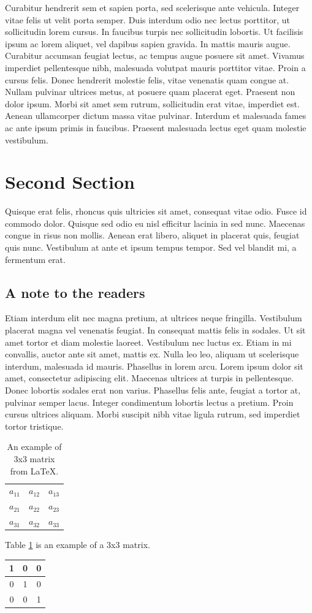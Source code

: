 \documentclass[12pt, a4paper]{report}
\begin{document}
Curabitur hendrerit sem et sapien porta, sed scelerisque ante vehicula. Integer vitae felis ut velit porta semper. Duis interdum odio nec lectus porttitor, ut sollicitudin lorem cursus. In faucibus turpis nec sollicitudin lobortis. Ut facilisis ipsum ac lorem aliquet, vel dapibus sapien gravida. In mattis mauris augue. Curabitur accumsan feugiat lectus, ac tempus augue posuere sit amet. Vivamus imperdiet pellentesque nibh, malesuada volutpat mauris porttitor vitae. Proin a cursus felis. Donec hendrerit molestie felis, vitae venenatis quam congue at. Nullam pulvinar ultrices metus, at posuere quam placerat eget. Praesent non dolor ipsum. Morbi sit amet sem rutrum, sollicitudin erat vitae, imperdiet est. Aenean ullamcorper dictum massa vitae pulvinar. Interdum et malesuada fames ac ante ipsum primis in faucibus. Praesent malesuada lectus eget quam molestie vestibulum.

\section{Second Section}

Quisque erat felis, rhoncus quis ultricies sit amet, consequat vitae odio. Fusce id commodo dolor. Quisque sed odio eu nisl efficitur lacinia in sed nunc. Maecenas congue in risus non mollis. Aenean erat libero, aliquet in placerat quis, feugiat quis nunc. Vestibulum at ante et ipsum tempus tempor. Sed vel blandit mi, a fermentum erat.

\subsection{A note to the readers}

Etiam interdum elit nec magna pretium, at ultrices neque fringilla. Vestibulum placerat magna vel venenatis feugiat. In consequat mattis felis in sodales. Ut sit amet tortor et diam molestie laoreet. Vestibulum nec luctus ex. Etiam in mi convallis, auctor ante sit amet, mattis ex. Nulla leo leo, aliquam ut scelerisque interdum, malesuada id mauris. Phasellus in lorem arcu. Lorem ipsum dolor sit amet, consectetur adipiscing elit. Maecenas ultrices at turpis in pellentesque. Donec lobortis sodales erat non varius. Phasellus felis ante, feugiat a tortor at, pulvinar semper lacus. Integer condimentum lobortis lectus a pretium. Proin cursus ultrices aliquam. Morbi suscipit nibh vitae ligula rutrum, sed imperdiet tortor tristique.


\begin{table}[h!]
\centering
\begin{tabular}{c c c}
  $a_{11}$ & $a_{12}$ & $a_{13}$ \\
  $a_{21}$ & $a_{22}$ & $a_{23}$ \\
  $a_{31}$ & $a_{32}$ & $a_{33}$ 
\end{tabular}
\caption{An example of 3x3 matrix from \LaTeX{}.}
\label{table:data}
\end{table}

Table \ref{table:data} is an example of a 3x3 matrix.

\begin{center}
\begin{tabular}{|c|c|c|}
  \hline
  1 & 0 & 0 \\
  \hline
  0 & 1 & 0 \\
  \hline
  0 & 0 & 1 \\
  \hline 
\end{tabular}
\end{center}
\end{document}
